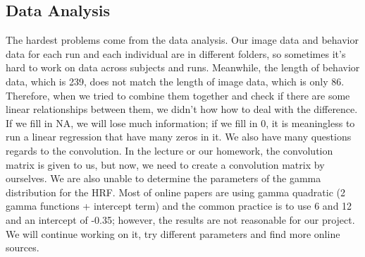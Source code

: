 \subsection{Data Analysis}
\noindent
The hardest problems come from the data analysis. Our image data and behavior 
data for each run and each individual are in different folders, so sometimes 
it's hard to work on data across subjects and runs.
Meanwhile, the length of behavior data, which is 239, does not match the length 
of image data, which is only 86. Therefore, when we tried to combine them 
together and check if there are some linear relationships between them, we 
didn't how how to deal with the difference. If we fill in NA, we will lose much 
information; if we fill in 0, it is meaningless to run a linear regression that 
have many zeros in it.
\noindent
We also have many questions regards to the convolution. In the lecture or our 
homework, the convolution matrix is given to us, but now, we need to create a 
convolution matrix by ourselves. We are also unable to determine the parameters 
of the gamma distribution for the HRF. Most of online papers are using gamma 
quadratic (2 gamma functions + intercept term) and the common practice is to 
use 6 and 12 and an intercept of -0.35; however, the results are not reasonable 
for our project. We will continue working on it, try different parameters and 
find more online sources.

